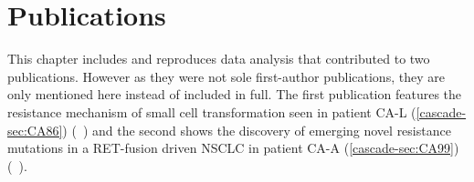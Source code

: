 \section{Publications}
\label{cascade-sec:publication}

This chapter includes and reproduces data analysis that contributed to two publications. However as they were not sole first-author publications, they are only mentioned here instead of included in full. 
The first publication features the resistance mechanism of small cell transformation seen in patient CA-L (\autoref{cascade-sec:CA86}) (\textit{}~\textcite{Burr2019}) and the second shows the discovery of emerging novel resistance mutations in a RET-fusion driven NSCLC in patient CA-A (\autoref{cascade-sec:CA99}) (\textit{}~\textcite{Solomon2020}).
